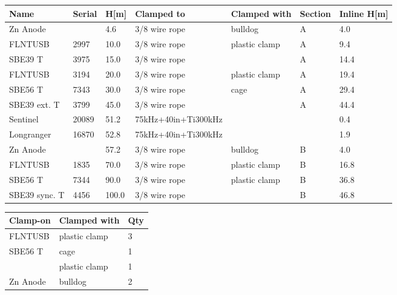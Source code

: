 \documentclass{article}
\begin{document}
\begin{tabularx}{\linewidth}{|l|l|l|l|l|l|l|}
\caption{M2: Clamp-on summary}\\
\hline
\textbf{Name} & \textbf{Serial} & \textbf{H[m]} & \textbf{Clamped to} & \textbf{Clamped with} & \textbf{Section} & \textbf{Inline H[m]} \\
\hline
Zn Anode &  & 4.6 & 3/8 wire rope & bulldog & A & 4.0 \\ \hline
FLNTUSB & 2997 & 10.0 & 3/8 wire rope & plastic clamp & A & 9.4 \\ \hline
SBE39 T & 3975 & 15.0 & 3/8 wire rope &  & A & 14.4 \\ \hline
FLNTUSB & 3194 & 20.0 & 3/8 wire rope & plastic clamp & A & 19.4 \\ \hline
SBE56 T & 7343 & 30.0 & 3/8 wire rope & cage & A & 29.4 \\ \hline
SBE39 ext. T & 3799 & 45.0 & 3/8 wire rope &  & A & 44.4 \\ \hline
Sentinel & 20089 & 51.2 & 75kHz+40in+Ti300kHz &  &  & 0.4 \\ \hline
Longranger & 16870 & 52.8 & 75kHz+40in+Ti300kHz &  &  & 1.9 \\ \hline
Zn Anode &  & 57.2 & 3/8 wire rope & bulldog & B & 4.0 \\ \hline
FLNTUSB & 1835 & 70.0 & 3/8 wire rope & plastic clamp & B & 16.8 \\ \hline
SBE56 T & 7344 & 90.0 & 3/8 wire rope & plastic clamp & B & 36.8 \\ \hline
SBE39 sync. T & 4456 & 100.0 & 3/8 wire rope &  & B & 46.8 \\ \hline
\end{tabularx}
\begin{tabularx}{\linewidth}{|l|l|l|}
\caption{M2: Clamped with summary}\\
\hline
\textbf{Clamp-on} & \textbf{Clamped with} & \textbf{Qty} \\
\hline
FLNTUSB & plastic clamp & 3 \\ \hline
SBE56 T & cage & 1 \\ \hline
 & plastic clamp & 1 \\ \hline
Zn Anode & bulldog & 2 \\ \hline
\end{tabularx}
\end{document}
